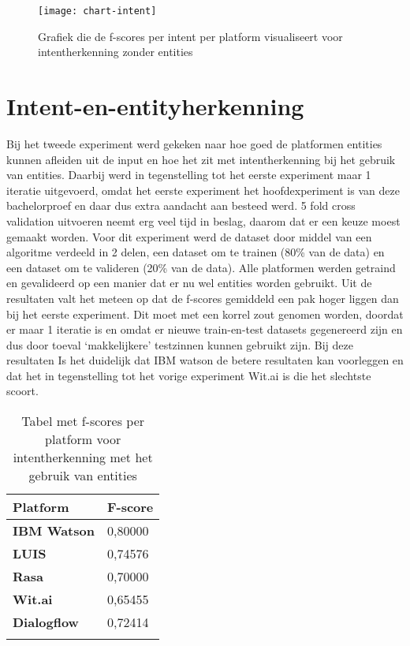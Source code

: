 \begin{figure}[H]
    \label{fig:chart-intent-no-entity}
    \centering
    \texttt{[image: chart-intent]}
    \caption{Grafiek die de f-scores per intent per platform visualiseert voor intentherkenning zonder entities}
\end{figure}

\section{Intent-en-entityherkenning}

Bij het tweede experiment werd gekeken naar hoe goed de platformen entities kunnen afleiden uit de input en hoe het zit met intentherkenning bij het gebruik van entities. Daarbij werd in tegenstelling tot het eerste experiment maar 1 iteratie uitgevoerd, omdat het eerste experiment het hoofdexperiment is van deze bachelorproef en daar dus extra aandacht aan besteed werd. 5 fold cross validation uitvoeren neemt erg veel tijd in beslag, daarom dat er een keuze moest gemaakt worden. Voor dit experiment werd de dataset door middel van een algoritme verdeeld in 2 delen, een dataset om te trainen (80\% van de data) en een dataset om te valideren (20\% van de data). Alle platformen werden getraind en gevalideerd op een manier dat er nu wel entities worden gebruikt. Uit de resultaten valt het meteen op dat de f-scores gemiddeld een pak hoger liggen dan bij het eerste experiment. Dit moet met een korrel zout genomen worden, doordat er maar 1 iteratie is en omdat er nieuwe train-en-test datasets gegenereerd zijn en dus door toeval ‘makkelijkere’ testzinnen kunnen gebruikt zijn. Bij deze resultaten Is het duidelijk dat IBM watson de betere resultaten kan voorleggen en dat het in tegenstelling tot het vorige experiment Wit.ai is die het slechtste scoort.


\begin{center}
    \begin{longtable}{| l | l |}
        \hline
        \textbf{Platform} & \textbf{F-score} \\ \hline
        \textbf{IBM Watson} & 0,80000 \\ \hline  
        \textbf{LUIS} & 0,74576 \\ \hline  
        \textbf{Rasa} & 0,70000 \\ \hline  
        \textbf{Wit.ai} & 0,65455  \\ \hline  
        \textbf{Dialogflow} & 0,72414 \\ \hline  
        \caption{Tabel met f-scores per platform voor intentherkenning met het gebruik van entities}                                    
    \end{longtable}
    \label{tbl:results-intent-entity}
\end{center}

